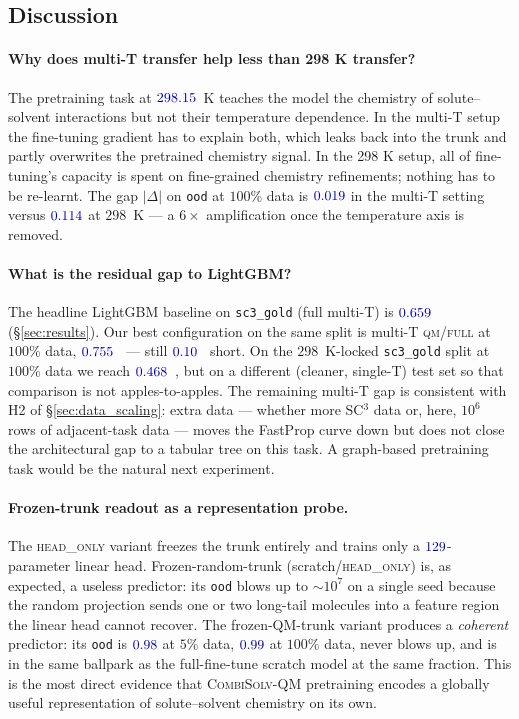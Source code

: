 \subsection{Discussion}
\label{sec:transfer_discussion}

\paragraph{Why does multi-T transfer help less than 298 K
transfer?}  The pretraining task at $\numval{298.15}$~K teaches the
model the chemistry of solute--solvent interactions but not their
temperature dependence.  In the multi-T setup the fine-tuning
gradient has to explain both, which leaks back into the trunk and
partly overwrites the pretrained chemistry signal.  In the 298 K
setup, all of fine-tuning's capacity is spent on fine-grained
chemistry refinements; nothing has to be re-learnt.  The gap
$|\Delta|$ on \texttt{ood} at $100$\% data is $\numval{0.019}$ in
the multi-T setting versus $\numval{0.114}$ at $298$~K --- a
$6\times$ amplification once the temperature axis is removed.

\paragraph{What is the residual gap to LightGBM?}  The headline
LightGBM baseline on \texttt{sc3\_gold} (full multi-T) is
$\numval{0.659}$~\RMSE{} (§\ref{sec:results}).  Our best
configuration on the same split is multi-T \textsc{qm}/\textsc{full}
at $100$\% data, $\numval{0.755}$~\RMSE{} --- still
$\numval{0.10}$~\logS{} short.  On the $298$~K-locked
\texttt{sc3\_gold} split at $100$\% data we reach
$\numval{0.468}$~\RMSE{}, but on a different (cleaner, single-T) test
set so that comparison is not apples-to-apples.  The remaining
multi-T gap is consistent with H2 of §\ref{sec:data_scaling}: extra
data --- whether more SC$^3$ data or, here, $10^6$ rows of
adjacent-task data --- moves the FastProp curve down but does not
close the architectural gap to a tabular tree on this task.  A
graph-based pretraining task would be the natural next experiment.

\paragraph{Frozen-trunk readout as a representation probe.}  The
\textsc{head\_only} variant freezes the trunk entirely and trains
only a $\numval{129}$-parameter linear head.  Frozen-random-trunk
(scratch/\textsc{head\_only}) is, as expected, a useless predictor:
its \texttt{ood} \RMSE{} blows up to $\sim \! 10^{7}$ on a single
seed because the random projection sends one or two long-tail
molecules into a feature region the linear head cannot recover.
The frozen-QM-trunk variant produces a \emph{coherent} predictor:
its \texttt{ood} \RMSE{} is $\numval{0.98}$ at $5$\% data,
$\numval{0.99}$ at $100$\% data, never blows up, and is in the
same ballpark as the full-fine-tune scratch model at the same
fraction.  This is the most direct evidence that
\textsc{CombiSolv-QM} pretraining encodes a globally useful
representation of solute--solvent chemistry on its own.

